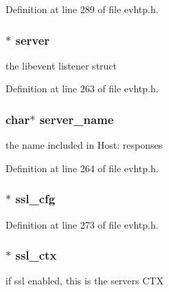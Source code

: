 \-Definition at line 289 of file evhtp.\-h.

\hypertarget{structevhtp__s_adbf9415567b9a26229148539d64a5eda}{
\subsubsection[{server}]{$\ast$ {\bf server}}}\label{structevhtp__s_adbf9415567b9a26229148539d64a5eda}
the libevent listener struct 

\-Definition at line 263 of file evhtp.\-h.

\hypertarget{structevhtp__s_a4e06dd572147d48785afd0439576487a}{
\subsubsection[{server\-\_\-name}]{\setlength{\rightskip}{0pt plus 5cm}char$\ast$ {\bf server\-\_\-name}}}\label{structevhtp__s_a4e06dd572147d48785afd0439576487a}
the name included in \-Host\-: responses 

\-Definition at line 264 of file evhtp.\-h.

\hypertarget{structevhtp__s_afb6cdde78523e94fa84f57e55280513f}{
\subsubsection[{ssl\-\_\-cfg}]{$\ast$ {\bf ssl\-\_\-cfg}}}\label{structevhtp__s_afb6cdde78523e94fa84f57e55280513f}


\-Definition at line 273 of file evhtp.\-h.

\hypertarget{structevhtp__s_a21d5d9eef41ecdb08b82db795aa6da98}{
\subsubsection[{ssl\-\_\-ctx}]{$\ast$ {\bf ssl\-\_\-ctx}}}\label{structevhtp__s_a21d5d9eef41ecdb08b82db795aa6da98}
if ssl enabled, this is the servers \-C\-T\-X 

